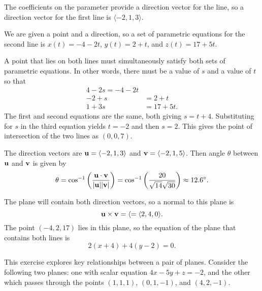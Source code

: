 \begin{exercises}
\begin{exerciseSolution}
  \ba
  	\item  The coefficients on the parameter provide a direction vector for the line, so a direction vector for the first line is $\langle -2, 1, 3 \rangle$. 
	\item  We are given a point and a direction, so a set of parametric equations for the second line is $x(t) = -4-2t$, $y(t) = 2+t$, and $z(t) = 17+5t$. 
	\item  A point that lies on both lines must simultaneously satisfy both sets of parametric equations. In other words, there must be a value of $s$ and a value of $t$ so that 
\begin{align*}
4-2s = -4-2t \\
-2 + s &=  2+t \\
1+3s &= 17+5t.
\end{align*}
The first and second equations are the same, both giving $s=t+4$. Substituting for $s$ in the third equation yields $t=-2$ and then $s=2$. This gives the point of intersection of the two lines as $(0,0,7)$. 
	\item  The direction vectors are $\mathbf{u} = \langle -2, 1, 3 \rangle$ and $\mathbf{v} = \langle -2, 1, 5 \rangle$. Then angle $\theta$ between $\mathbf{u}$ and $\mathbf{v}$ is given by 
\[\theta = \cos^{-1}\left(\frac{\mathbf{u} \cdot \mathbf{v}}{|\mathbf{u}| |\mathbf{v}|} \right) = \cos^{-1}\left(\frac{20}{\sqrt{14} \sqrt{30}} \right) \approx 12.6^{\circ}.\]
 	\item The plane will contain both direction vectors, so a normal to this plane is 
\[\mathbf{u} \times \mathbf{v} = \langle = \langle 2, 4, 0 \rangle.\]
The point $(-4,2,17)$ lies in this plane, so the equation of the plane that contains both lines is 
\[2(x+4)+4(y-2) = 0.\]
  \ea 
\end{exerciseSolution}

\item \label{Ez:9.5.3}   This exercise explores key relationships between a pair of planes.  Consider the following two planes:  one with scalar equation $4x - 5y + z = -2$, and the other which passes through the points $(1,1,1)$, $(0,1,-1)$, and $(4, 2, -1)$.



\end{exercises}
